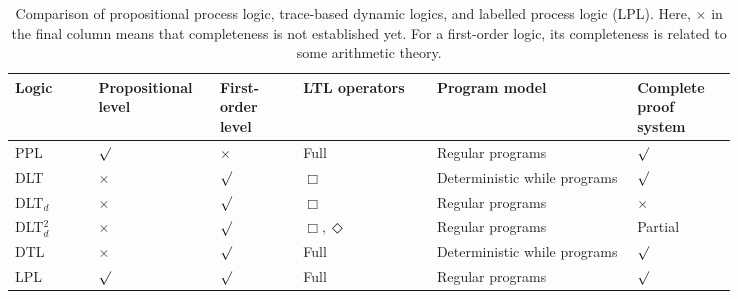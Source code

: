 \documentclass[manuscript,screen]{acmart}
\newcommand{\PPL}[0]{\mbox{PPL}}
\newcommand{\DLT}[0]{\mbox{DLT}}
\newcommand{\diffTL}[0]{\mbox{DLT$_d$}}
\newcommand{\diffTLii}[0]{\mbox{DLT$^2_d$}}
\newcommand{\A}[1]{\mbox{ \textbf{#1} }}
\newcommand{\MO}{\A{MO}}
\newcommand{\EMO}{\A{EMO}}
\begin{document}
\begin{table}[t]
\centering
\small
\begin{tabular}{p{0.10\linewidth}p{0.12\linewidth}p{0.10\linewidth}p{0.16\linewidth}p{0.24\linewidth}p{0.12\linewidth}}
\toprule
Logic & Propositional level & First-order level & LTL operators & Program model & Complete proof system \\
\midrule
\PPL~\cite{Harel82} & $\surd$ & $\times$ & Full & Regular programs & $\surd$ \\
\DLT~\cite{Beckert01} & $\times$ & $\surd$ & $\Box$ & Deterministic while programs & $\surd$ \\
\diffTL~\cite{PlatzersTDL} & $\times$ & $\surd$ & $\Box$ & Regular programs & $\times$ \\
\diffTLii~\cite{DTL2} & $\times$ & $\surd$ & $\Box,\Diamond$ & Regular programs & Partial~\cite{Ahmad21} \\
DTL~\cite{Beckert13} & $\times$ & $\surd$ & Full & Deterministic while programs & $\surd$ \\
LPL & $\surd$ & $\surd$ & Full & Regular programs & $\surd$ \\
\bottomrule
\end{tabular}
\caption{Comparison of propositional process logic, trace-based dynamic logics, and labelled process logic (LPL).  Here, $\times$ in the final column means that completeness is not established yet. For a first-order logic, its completeness is related to some arithmetic theory. }
\label{table:comparison of related work}
\end{table}
\end{document}
